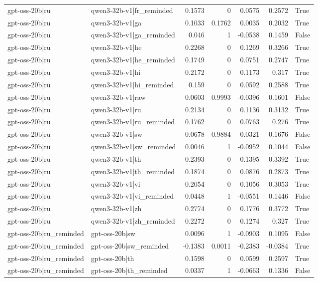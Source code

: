 \begin{table}
\begin{tabular}{l l r r r r l}
gpt-oss-20b|ru & qwen3-32b-v1|fr_reminded & 0.1573 & 0 & 0.0575 & 0.2572 & True \\
gpt-oss-20b|ru & qwen3-32b-v1|ga & 0.1033 & 0.1762 & 0.0035 & 0.2032 & True \\
gpt-oss-20b|ru & qwen3-32b-v1|ga_reminded & 0.046 & 1 & -0.0538 & 0.1459 & False \\
gpt-oss-20b|ru & qwen3-32b-v1|he & 0.2268 & 0 & 0.1269 & 0.3266 & True \\
gpt-oss-20b|ru & qwen3-32b-v1|he_reminded & 0.1749 & 0 & 0.0751 & 0.2747 & True \\
gpt-oss-20b|ru & qwen3-32b-v1|hi & 0.2172 & 0 & 0.1173 & 0.317 & True \\
gpt-oss-20b|ru & qwen3-32b-v1|hi_reminded & 0.159 & 0 & 0.0592 & 0.2588 & True \\
gpt-oss-20b|ru & qwen3-32b-v1|raw & 0.0603 & 0.9993 & -0.0396 & 0.1601 & False \\
gpt-oss-20b|ru & qwen3-32b-v1|ru & 0.2134 & 0 & 0.1136 & 0.3132 & True \\
gpt-oss-20b|ru & qwen3-32b-v1|ru_reminded & 0.1762 & 0 & 0.0763 & 0.276 & True \\
gpt-oss-20b|ru & qwen3-32b-v1|sw & 0.0678 & 0.9884 & -0.0321 & 0.1676 & False \\
gpt-oss-20b|ru & qwen3-32b-v1|sw_reminded & 0.0046 & 1 & -0.0952 & 0.1044 & False \\
gpt-oss-20b|ru & qwen3-32b-v1|th & 0.2393 & 0 & 0.1395 & 0.3392 & True \\
gpt-oss-20b|ru & qwen3-32b-v1|th_reminded & 0.1874 & 0 & 0.0876 & 0.2873 & True \\
gpt-oss-20b|ru & qwen3-32b-v1|vi & 0.2054 & 0 & 0.1056 & 0.3053 & True \\
gpt-oss-20b|ru & qwen3-32b-v1|vi_reminded & 0.0448 & 1 & -0.0551 & 0.1446 & False \\
gpt-oss-20b|ru & qwen3-32b-v1|zh & 0.2774 & 0 & 0.1776 & 0.3772 & True \\
gpt-oss-20b|ru & qwen3-32b-v1|zh_reminded & 0.2272 & 0 & 0.1274 & 0.327 & True \\
gpt-oss-20b|ru_reminded & gpt-oss-20b|sw & 0.0096 & 1 & -0.0903 & 0.1095 & False \\
gpt-oss-20b|ru_reminded & gpt-oss-20b|sw_reminded & -0.1383 & 0.0011 & -0.2383 & -0.0384 & True \\
gpt-oss-20b|ru_reminded & gpt-oss-20b|th & 0.1598 & 0 & 0.0599 & 0.2597 & True \\
gpt-oss-20b|ru_reminded & gpt-oss-20b|th_reminded & 0.0337 & 1 & -0.0663 & 0.1336 & False \\

\end{tabular}
\end{table}
